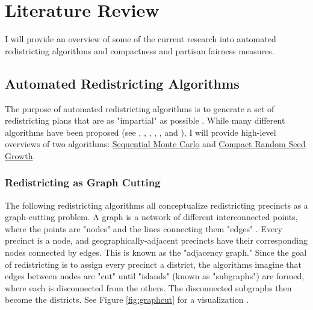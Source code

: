 \section{Literature Review}
\label{sec:litreview}

I will provide an overview of some of the current research into automated redistricting algorithms and compactness and partisan fairness measures. 

\subsection{Automated Redistricting Algorithms}

The purpose of automated redistricting algorithms is to generate a set of redistricting plans that are as "impartial" as possible \parencite{chen2013}. While many different algorithms have been proposed (see \textcite{altman2009}, \textcite{haas2020}, \textcite{lara-caballero2019}, \textcite{macmillan2001}, \textcite{weaver1963}, and \textcite{xiao2008}), I will provide high-level overviews of two algorithms: \hyperref[sec:smc]{Sequential Monte Carlo} and \hyperref[sec:crsg]{Compact Random Seed Growth}. 

\subsubsection{Redistricting as Graph Cutting}
\label{sec:redistasgraphcut}


The following redistricting algorithms all conceptualize redistricting precincts as a graph-cutting problem. A graph is a network of different interconnected points, where the points are "nodes" and the lines connecting them "edges" \parencite{fifield2020}. Every precinct is a node, and geographically-adjacent precincts have their corresponding nodes connected by edges. This is known as the "adjacency graph." Since the goal of redistricting is to assign every precinct a district, the algorithms imagine that edges between nodes are "cut" until "islands" (known as "subgraphs") are formed, where each is disconnected from the others. The disconnected subgraphs then become the districts. See Figure \ref{fig:graphcut} for a visualization \parencite{fifield2020}. 

